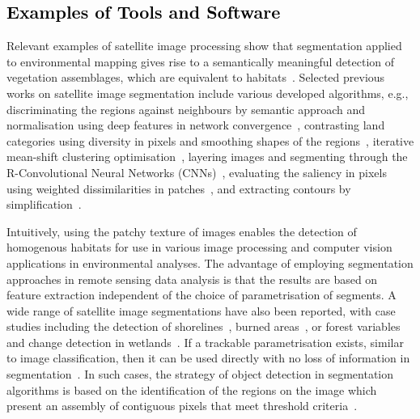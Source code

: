 \documentclass[analytics,article,accept,pdftex,moreauthors]{Definitions/mdpi}
\begin{document}
\subsection{\textcolor{black}{Examples of Tools and Software}}

{Relevant} examples of satellite image processing show that segmentation applied to environmental mapping gives rise to a semantically meaningful detection of vegetation assemblages, which are equivalent to habitats~\cite{MUNYATI20131}. Selected previous works on satellite image segmentation include various developed algorithms, e.g., discriminating the regions against neighbours by semantic approach and normalisation using deep features in network convergence~\cite{WANG2023108734}, contrasting land categories using diversity in pixels and smoothing shapes of the regions~\cite{MAURYA2023102078}, iterative mean-shift clustering optimisation~\cite{6351712}, layering images and segmenting through the R-Convolutional Neural Networks (CNNs)~\cite{8519391}, evaluating the saliency in pixels using weighted dissimilarities in patches~\cite{6727739}, and extracting contours by simplification~\cite{WU20151133,8630683}. 

Intuitively, using the patchy texture of images enables the detection of homogenous habitats for use in various image processing and computer vision applications in environmental analyses. The advantage of employing segmentation approaches in remote sensing data analysis is that the results are based on feature extraction independent of the choice of parametrisation of segments. A wide range of satellite image segmentations have also been reported, with case studies including the detection of shorelines~\cite{ERDEM2021964}, burned areas~\cite{KOTARIDIS2023100944,Toulouse}, or forest variables~\cite{MAKELA200166} and change detection in wetlands~\cite{ZHANG2023129590}. If a trackable parametrisation exists, similar to image classification, then it can be used directly with no loss of information in segmentation~\cite{Kharma}. In such cases, the strategy of object detection in segmentation algorithms is based on the identification of the regions on the image which present an assembly of contiguous pixels that meet threshold criteria~\cite{Aalan,Awad}. 
\end{document}
